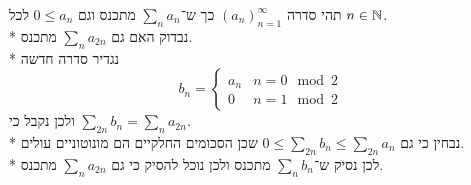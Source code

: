 



תהי סדרה ${(a_n)}_{n = 1}^\infty$ כך ש־$\sum_n a_n$ מתכנס וגם $0 \le a_n$ לכל $n \in \mathbb{N}$. \\*
נבדוק האם גם $\sum_n a_{2n}$ מתכנס. \\*
נגדיר סדרה חדשה
\[
	b_n = \begin{cases}
		a_n & n = 0 \mod 2 \\
		0 & n = 1 \mod 2
	\end{cases}
\]
ולכן נקבל כי $\sum_{2n} b_n = \sum_n a_{2n}$. \\*
נבחין כי גם $0 \le \sum_{2n} b_n \le \sum_{2n} a_n$ שכן הסכומים החלקיים הם מונוטוניים עולים. \\*
לכן נסיק ש־$\sum_n b_n$ מתכנס ולכן נוכל להסיק כי גם $\sum_n a_{2n}$ מתכנס.


